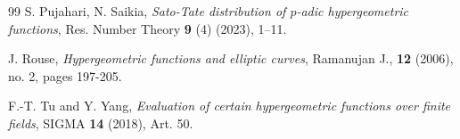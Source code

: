 \documentclass[12pt]{amsart}
\theoremstyle{plain}
\theoremstyle{definition}
\theoremstyle{remark}
\numberwithin{equation}{section}
\begin{document}
\begin{thebibliography}{99}
 S. Pujahari, N. Saikia, \emph{Sato-Tate distribution of $p$-adic hypergeometric functions}, Res. Number Theory \textbf{9} (4) (2023), 1--11.
		
				
 J. Rouse, \emph{Hypergeometric functions and elliptic curves}, Ramanujan J., \textbf{12} (2006), no. 2, pages 197-205.
		
				
		 F.-T. Tu and Y. Yang, \emph{Evaluation of certain hypergeometric functions over finite fields}, SIGMA \textbf{14} (2018), Art.  50.
		
		
		
		
	\end{thebibliography}
	
	
	
	
\end{document}
